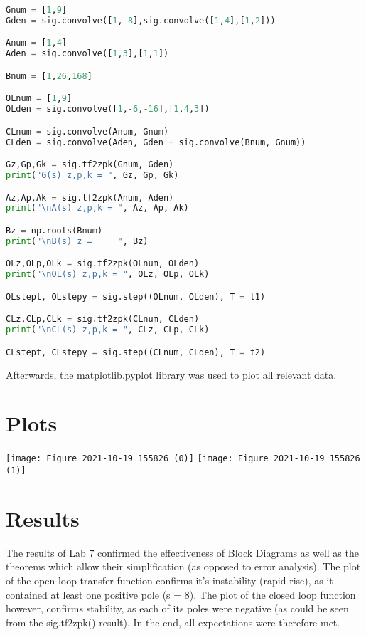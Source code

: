 \documentclass[12pt]{report}
\begin{document}
\begin{lstlisting}[language=Python]
Gnum = [1,9]
Gden = sig.convolve([1,-8],sig.convolve([1,4],[1,2]))

Anum = [1,4]
Aden = sig.convolve([1,3],[1,1])

Bnum = [1,26,168]

OLnum = [1,9]
OLden = sig.convolve([1,-6,-16],[1,4,3])

CLnum = sig.convolve(Anum, Gnum)
CLden = sig.convolve(Aden, Gden + sig.convolve(Bnum, Gnum))

Gz,Gp,Gk = sig.tf2zpk(Gnum, Gden)
print("G(s) z,p,k = ", Gz, Gp, Gk)

Az,Ap,Ak = sig.tf2zpk(Anum, Aden)
print("\nA(s) z,p,k = ", Az, Ap, Ak)

Bz = np.roots(Bnum)
print("\nB(s) z =     ", Bz)

OLz,OLp,OLk = sig.tf2zpk(OLnum, OLden)
print("\nOL(s) z,p,k = ", OLz, OLp, OLk)

OLstept, OLstepy = sig.step((OLnum, OLden), T = t1)

CLz,CLp,CLk = sig.tf2zpk(CLnum, CLden)
print("\nCL(s) z,p,k = ", CLz, CLp, CLk)

CLstept, CLstepy = sig.step((CLnum, CLden), T = t2)
\end{lstlisting}
Afterwards, the matplotlib.pyplot library was used to plot all relevant data.


\section{Plots}

\begin{center}
    \texttt{[image: Figure 2021-10-19 155826 (0)]}
    \texttt{[image: Figure 2021-10-19 155826 (1)]}
\end{center}

\section{Results}
The results of Lab 7 confirmed the effectiveness of Block Diagrams as well as the theorems which allow their simplification (as opposed to error analysis). The plot of the open loop transfer function confirms it's instability (rapid rise), as it contained at least one positive pole (s = 8). The plot of the closed loop function however, confirms stability, as each of its poles were negative (as could be seen from the sig.tf2zpk() result). In the end, all expectations were therefore met.
\end{document}
